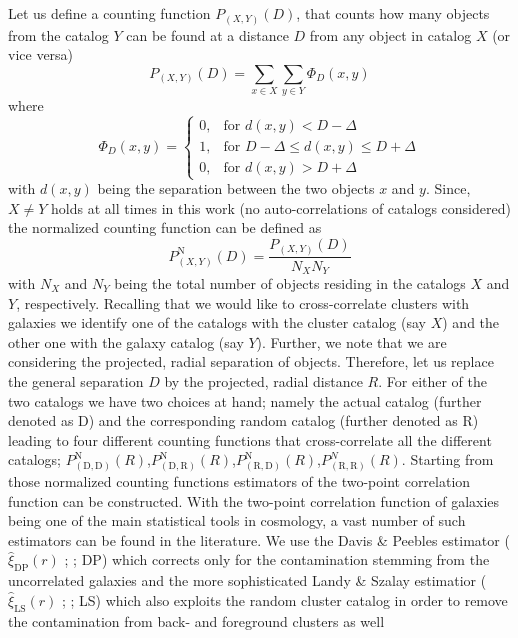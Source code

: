 \documentclass[a4paper,fleqn,usenatbib]{mnras}
\newcommand{\fhat}[1]{\expandafter\hat#1}
\begin{document}
Let us define a counting function $P_{(X,Y)}(D)$, that counts how many objects from the catalog $Y$ can be found at a distance $D$ from any object in catalog $X$ (or vice versa)
\begin{equation}
P_{(X,Y)}(D)=\sum_{x \in X} \sum_{y \in Y} \Phi_D(x,y)
\end{equation}
where 
\begin{equation}
  \Phi_D(x,y) = \left.
  \begin{cases}
    0, & \text{for } d(x,y)<D-\Delta \\
    1, & \text{for }  D-\Delta \leq d(x,y) \leq D+\Delta \\
    0, & \text{for } d(x,y)>D+\Delta
  \end{cases}\right.
\end{equation}
with $d(x,y)$ being the separation between the two objects $x$ and $y$. Since, $X \neq Y$ holds at all times in this work (no auto-correlations of catalogs considered) the normalized counting function can be defined as 
\begin{equation}
P^{\mathrm{N}}_{(X,Y)}(D)=\frac{P_{(X,Y)}(D)}{N_X N_Y}
\end{equation}
with $N_X$ and $N_Y$ being the total number of objects residing in the catalogs $X$ and $Y$, respectively. 
Recalling that we would like to cross-correlate clusters with galaxies we identify one of the catalogs with the cluster catalog (say $X$) and the other one with the galaxy catalog (say $Y$). Further, we note that we are considering the projected, radial separation of objects. Therefore, let us replace the general separation $D$ by the projected, radial distance $R$. For either of the two catalogs we have two choices at hand; namely the actual catalog (further denoted as D) and the corresponding random catalog (further denoted as R) leading to four different counting functions that cross-correlate all the different catalogs; $P^{\mathrm{N}}_{\mathrm{(D,D)}}(R)$,$P^{\mathrm{N}}_{\mathrm{(D,R)}}(R)$,$P^{\mathrm{N}}_{\mathrm{(R,D)}}(R)$,$P^N_{\mathrm{(R,R)}}(R)$.
Starting from those normalized counting functions estimators of the two-point correlation function can be constructed. With the two-point correlation function of galaxies being one of the main statistical tools in cosmology, a vast number of such estimators can be found in the literature. We use the Davis \& Peebles estimator ($\fhat{\xi_{\mathrm{DP}}(r)}$ ; \citep{davis1983survey} ; DP) which corrects only for the contamination stemming from the uncorrelated galaxies and the more sophisticated Landy \& Szalay estimatior ($\fhat{\xi_{\mathrm{LS}}(r)}$ ; \citep{landy1993bias} ; LS) which also exploits the random cluster catalog in order to remove the contamination from back- and foreground clusters as well
\end{document}

